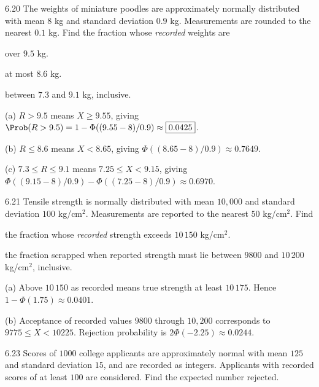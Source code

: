 \documentclass[11pt,oneside]{article}
\begin{document}
\begin{exercise}{6.20}
The weights of miniature poodles are approximately normally distributed with mean $8$ kg and standard deviation $0.9$ kg. Measurements are rounded to the nearest $0.1$ kg. Find the fraction whose \emph{recorded} weights are
\begin{exercisesubparts}
\item over $9.5$ kg.
\item at most $8.6$ kg.
\item between $7.3$ and $9.1$ kg, inclusive.
\end{exercisesubparts}
\end{exercise}

\begin{solution}
\noindent\textup{(a)} $R>9.5$ means $X\ge9.55$, giving $\Prob(R>9.5)=1-\Phi((9.55-8)/0.9)\approx\boxed{0.0425}$.

\noindent\textup{(b)} $R\le8.6$ means $X<8.65$, giving $\Phi((8.65-8)/0.9)\approx\boxed{0.7649}$.

\noindent\textup{(c)} $7.3\le R\le9.1$ means $7.25\le X<9.15$, giving $\Phi((9.15-8)/0.9)-\Phi((7.25-8)/0.9)\approx\boxed{0.6970}$.
\end{solution}

\begin{exercise}{6.21}
Tensile strength is normally distributed with mean $10{,}000$ and standard deviation $100$ kg/cm$^2$. Measurements are reported to the nearest $50$ kg/cm$^2$. Find
\begin{exercisesubparts}
\item the fraction whose \emph{recorded} strength exceeds $10\,150$ kg/cm$^2$.
\item the fraction scrapped when reported strength must lie between $9800$ and $10\,200$ kg/cm$^2$, inclusive.
\end{exercisesubparts}
\end{exercise}

\begin{solution}
\noindent\textup{(a)} Above $10\,150$ as recorded means true strength at least $10\,175$. Hence $1-\Phi(1.75)\approx\boxed{0.0401}$.

\noindent\textup{(b)} Acceptance of recorded values $9800$ through $10{,}200$ corresponds to $9775\le X<10225$. Rejection probability is $2\Phi(-2.25)\approx\boxed{0.0244}$.
\end{solution}

\begin{exercise}{6.23}
Scores of $1000$ college applicants are approximately normal with mean $125$ and standard deviation $15$, and are recorded as integers. Applicants with recorded scores of at least $100$ are considered. Find the expected number rejected.
\end{exercise}
\end{document}
